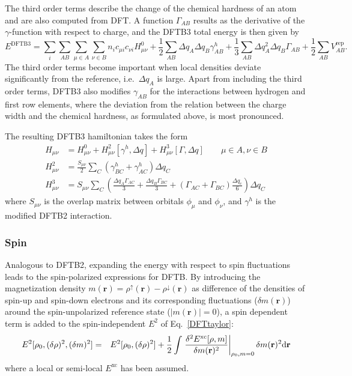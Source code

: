\documentclass{revtex4-1}
\begin{document}
The third order terms describe the change of the chemical hardness of an atom
and are also computed from DFT. A function $\Gamma_{AB}$ results as the
derivative of the $\gamma$-function with respect to charge, and the DFTB3 total
energy is then given by
\begin{equation}
  E^{\text{DFTB3}} = \sum_i \sum_{AB}\sum_{\mu\in A}\sum_{\nu\in B} n_i c_{\mu i}
  c_{\nu i} H^0_{\mu\nu} + \frac{1}{2}\sum_{AB} \Delta q_A \Delta
  q_B\gamma_{AB}^h
  + \frac{1}{3}\sum_{AB} \Delta q_A^2 \Delta q_B\Gamma_{AB} +
  \frac{1}{2}\sum_{AB}V^{\text{rep}}_{AB}.
  \label{eq:etot}
\end{equation}
%
The third order terms become important when local densities deviate
significantly from the reference, i.e.\ $\Delta q_A$ is large. Apart from
including the third order terms, DFTB3 also modifies $\gamma_{AB}$ for the
interactions between hydrogen and first row elements,\cite{Elstner2007} where
the deviation from the relation between the charge width and the chemical
hardness, as formulated above, is most pronounced.

The resulting DFTB3 hamiltonian takes the form
\begin{align}
H_{\mu\nu} &= H^0_{\mu\nu} + H^2_{\mu\nu}[\gamma^h,\Delta q] + H^3_{\mu\nu}[\Gamma,\Delta q] \qquad{\mu \in A, \nu \in B} \label{dftb3Ham}\\
H^2_{\mu\nu} &= \frac{S_{\mu\nu}}{2} \sum\limits_C \left( \gamma^h_{BC} + \gamma^h_{AC} \right) \Delta q_C\\
H^3_{\mu\nu} &= S_{\mu\nu} \sum\limits_C \left( \frac{\Delta q_A \Gamma_{AC}}{3} + \frac{\Delta q_B
\Gamma_{BC}}{3} + \left( \Gamma_{AC} + \Gamma_{BC}
\right) \frac{\Delta q_c}{6} \right) \Delta q_C
\end{align}
where $S_{\mu\nu}$ is the overlap matrix between orbitals $\phi_\mu$ and
$\phi_\nu$, and $\gamma^h$ is the modified DFTB2 interaction.

\subsubsection{Spin}

Analogous to DFTB2, expanding the energy with respect to spin
fluctuations\cite{Frauenheim2000, Koehler2005, Koehler2001} leads to the
spin-polarized expressions for DFTB. By introducing the magnetization density
$m(\mathbf{r})=\rho^{\uparrow}(\mathbf{r})-\rho^{\downarrow}(\mathbf{r})$ as
difference of the densities of spin-up and spin-down electrons and its
corresponding fluctuations ($\delta m(\mathbf{r})$) around the spin-unpolarized
reference state ($|m(\mathbf{r})|=0$), a spin dependent term is added to the
spin-independent $E^2$ of Eq.~\eqref{DFTtaylor}:
\begin{eqnarray}
E^2[\rho_0,(\delta \rho)^2,(\delta m)^2]
  &=& E^2[\rho_0,(\delta \rho)^2] 
  +\frac{1}{2}\int 
  \eval{\frac{\delta^2E^{\text{xc}}[\rho,m]}{\delta m(\mathbf{r})^2}}_{\rho_0,m=0}\delta m(\mathbf{r})^2\mathrm{d}\mathbf{r} \label{spin1}
\end{eqnarray}
where a local or semi-local $E^{\text{xc}}$ has been assumed.
\end{document}
